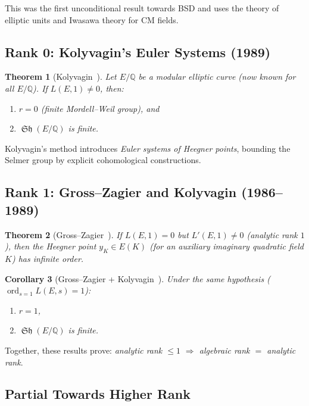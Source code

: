 \documentclass[12pt,a4paper]{article}
\newtheorem{theorem}{Theorem}[section]
\newtheorem{corollary}[theorem]{Corollary}
\theoremstyle{remark}
\DeclareMathOperator{\Sha}{\mathfrak{Sh}}
\begin{document}
This was the first unconditional result towards BSD and uses the theory of elliptic
units and Iwasawa theory for CM fields.

\subsection{Rank 0: Kolyvagin's Euler Systems (1989)}

\begin{theorem}[Kolyvagin~\cite{Kolyvagin1989}]
  Let $E/\mathbb{Q}$ be a modular elliptic curve (now known for all $E/\mathbb{Q}$).
  If $L(E,1) \neq 0$, then:
  \begin{enumerate}[nosep]
    \item $r = 0$ (finite Mordell--Weil group), and
    \item $\Sha(E/\mathbb{Q})$ is finite.
  \end{enumerate}
\end{theorem}

Kolyvagin's method introduces \emph{Euler systems of Heegner points}, bounding the
Selmer group by explicit cohomological constructions.

\subsection{Rank 1: Gross--Zagier and Kolyvagin (1986--1989)}

\begin{theorem}[Gross--Zagier~\cite{GrossZagier1986}]
  If $L(E,1) = 0$ but $L'(E,1) \neq 0$ (analytic rank $1$), then the Heegner point
  $y_K \in E(K)$ (for an auxiliary imaginary quadratic field $K$) has infinite order.
\end{theorem}

\begin{corollary}[Gross--Zagier + Kolyvagin~\cite{Kolyvagin1989}]
  Under the same hypothesis ($\operatorname{ord}_{s=1} L(E,s) = 1$):
  \begin{enumerate}[nosep]
    \item $r = 1$,
    \item $\Sha(E/\mathbb{Q})$ is finite.
  \end{enumerate}
\end{corollary}

Together, these results prove: \emph{analytic rank $\leq 1$ $\Rightarrow$ algebraic rank $=$ analytic rank}.

\subsection{Partial Towards Higher Rank}
\end{document}
